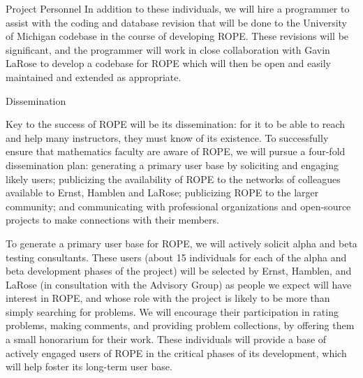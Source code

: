 \documentclass[11pt]{article}
\begin{document}
\begin{section}{Project Personnel}
In addition to these individuals, we will hire a programmer to assist with
the coding and database revision that will be done to the University of
Michigan codebase in the course of developing ROPE. These revisions
will be significant, and the programmer will work in close collaboration
with Gavin LaRose to develop a codebase for ROPE which will then be
open and easily maintained and extended as appropriate. 

\end{section}

\begin{section}{Dissemination}

Key to the success of ROPE will be its dissemination: for it to be able
to reach and help many instructors, they must know of its existence.  To
successfully ensure that mathematics faculty are aware of ROPE, we will
pursue a four-fold dissemination plan: generating a primary user base by
soliciting and engaging likely users; publicizing the availability of ROPE to the networks of colleagues available to Ernst, Hamblen and
LaRose; publicizing ROPE to the larger community; and communicating
with professional organizations and open-source projects to make
connections with their members.

To generate a primary user base for ROPE, we will actively solicit
alpha and beta testing consultants.  These users (about 15
individuals for each of the alpha and beta development phases of the
project) will be selected by Ernst, Hamblen, and LaRose (in consultation
with the Advisory Group) as people we expect will have interest in ROPE, and whose role with the project is likely to be more than simply
searching for problems.  We will encourage their participation in rating
problems, making comments, and providing problem collections, by offering them a
small honorarium for their work.  These individuals will provide a
base of actively engaged users of ROPE in the critical phases
of its development, which will help foster its long-term user base.


\end{section}
\end{document}
